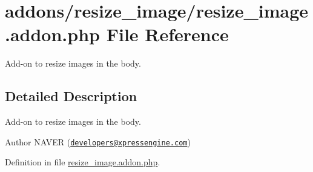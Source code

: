 \hypertarget{resize__image_8addon_8php}{\section{addons/resize\-\_\-image/resize\-\_\-image.addon.\-php File Reference}
\label{resize__image_8addon_8php}
}


Add-\/on to resize images in the body.  




\subsection{Detailed Description}
Add-\/on to resize images in the body. \begin{DoxyAuthor}{Author}
N\-A\-V\-E\-R (\href{mailto:developers@xpressengine.com}{\tt developers@xpressengine.\-com}) 
\end{DoxyAuthor}


Definition in file \hyperlink{resize__image_8addon_8php_source}{resize\-\_\-image.\-addon.\-php}.

